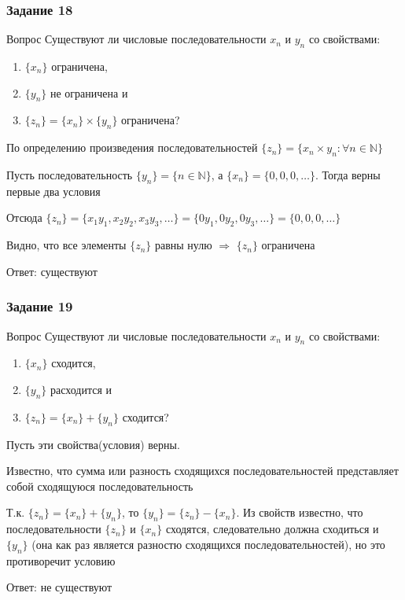\documentclass[8pt]{beamer}
\begin{document}
  \begin{frame}
    \frametitle{Задание 18}

    \begin{block}{Вопрос}
      Существуют ли числовые последовательности $x_n$ и $y_n$ со свойствами:
      \begin{enumerate}
        \item $\{x_n\}$ ограничена,
        \item $\{y_n\}$ не ограничена и
        \item $\{z_n\} = \{x_n\} \times \{y_n\}$ ограничена?
      \end{enumerate}
    \end{block} \pause

    По определению произведения последовательностей $\{z_n\} = \{x_n \times y_n: \forall n \in \mathbb{N}\}$ \pause

    Пусть последовательность $\{y_n\} = \{n \in \mathbb{N}\}$, а $\{x_n\} = \{0, 0, 0, \dots\}$. Тогда верны первые два условия \pause
  
    Отсюда $\{z_n\} = \{x_1y_1, x_2y_2, x_3y_3, \dots\} = \{0y_1, 0y_2, 0y_3, \dots\} = \{0, 0, 0, \dots\}$ \pause

    Видно, что все элементы $\{z_n\}$ равны нулю $\Rightarrow$ $\{z_n\}$ ограничена \pause

    \begin{flushright}
      Ответ: существуют
    \end{flushright}
  \end{frame}

  \begin{frame}
    \frametitle{Задание 19}

    \begin{block}{Вопрос}
      Существуют ли числовые последовательности $x_n$ и $y_n$ со свойствами:
      \begin{enumerate}
        \item $\{x_n\}$ сходится,
        \item $\{y_n\}$ расходится и
        \item $\{z_n\} = \{x_n\} + \{y_n\}$ сходится?
      \end{enumerate}
    \end{block} \pause

    Пусть эти свойства(условия) верны. \pause

    Известно, что сумма или разность сходящихся последовательностей представляет собой сходящуюся последовательность \pause
  
    Т.к. $\{z_n\} = \{x_n\} + \{y_n\}$, то $\{y_n\} = \{z_n\} - \{x_n\}$. Из свойств известно, что
    последовательности $\{z_n\}$ и $\{x_n\}$ сходятся, следовательно должна сходиться и $\{y_n\}$
    (она как раз является разностю сходящихся последовательностей), но это противоречит условию \pause

    \begin{flushright}
      Ответ: не существуют
    \end{flushright}
  \end{frame}
\end{document}

